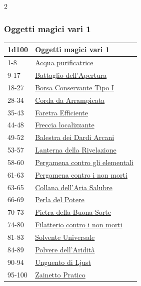 \begin{multicols}{2}
{\subsubsection{Oggetti magici vari 1}\hypertarget{Oggetti Magici Vari 1}{}

{\small\begin{tabularx}{\linewidth}{ll}
		\toprule
\rowcolor{gray!20}\textbf{1d100} & \textbf{Oggetti magici vari 1}\\
\toprule
1-8 & \hyperlink{Acqua purificatrice}{Acqua purificatrice}\\
\rowcolor{gray!20}9-17 & \hyperlink{Battaglio dell'Apertura}{Battaglio dell'Apertura}\\
18-27 & \hyperlink{Borsa Conservante Tipo I}{Borsa Conservante Tipo I}\\
\rowcolor{gray!20}28-34 & \hyperlink{Corda da Arrampicata}{Corda da Arrampicata}\\
35-43 & \hyperlink{Faretra Efficiente}{Faretra Efficiente}\\
\rowcolor{gray!20}44-48 & \hyperlink{Freccia localizzante}{Freccia localizzante}\\
49-52 & \hyperlink{Balestra dei Dardi Arcani}{Balestra dei Dardi Arcani}\\
\rowcolor{gray!20}53-57 & \hyperlink{Lanterna della Rivelazione}{Lanterna della Rivelazione}\\
58-60 & \hyperlink{Pergamena contro gli elementali}{Pergamena contro gli elementali}\\
\rowcolor{gray!20}61-63 & \hyperlink{Pergamena contro i non morti}{Pergamena contro i non morti}\\
63-65 & \hyperlink{Collana dell'Aria Salubre}{Collana dell'Aria Salubre}\\
\rowcolor{gray!20}66-69 & \hyperlink{Perla del Potere}{Perla del Potere}\\
70-73 & \hyperlink{Pietra della Buona Sorte}{Pietra della Buona Sorte}\\
\rowcolor{gray!20}74-80 & \hyperlink{Filatterio contro i non morti}{Filatterio contro i non morti}\\
81-83 & \hyperlink{Solvente Universale}{Solvente Universale}\\
\rowcolor{gray!20}84-89 & \hyperlink{Polvere dell'Aridità}{Polvere dell'Aridità}\\
90-94 & \hyperlink{Unguento di Ljust}{Unguento di Ljust}\\
\rowcolor{gray!20}95-100 & \hyperlink{Zainetto Pratico}{Zainetto Pratico}
\end{tabularx}}

}
\end{multicols}
